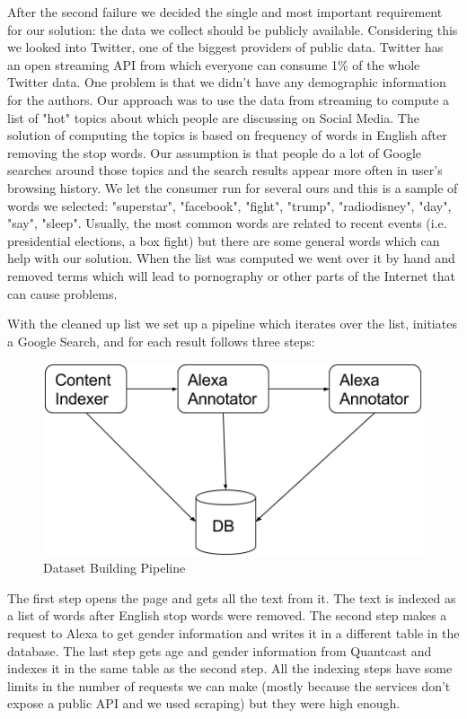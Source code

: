 After the second failure we decided the single and most important requirement for our solution: the data we collect should be publicly available. Considering this we looked into Twitter, one of the biggest providers of public data. Twitter has an open streaming API from which everyone can consume 1\% of the whole Twitter data. One problem is that we didn't have any demographic information for the authors. Our approach was to use the data from streaming to compute a list of "hot" topics about which people are discussing on Social Media. The solution of computing the topics is based on frequency of words in English after removing the stop words. Our assumption is that people do a lot of Google searches around those topics and the search results appear more often in user's browsing history.  We let the consumer run for several ours and this is a sample of words we selected: "superstar", "facebook", "fight", "trump", "radiodisney", "day", "say", "sleep". Usually, the most common words are related to recent events (i.e. presidential elections, a box fight) but there are some general words which can help with our solution. When the list was computed we went over it by hand and removed terms which will lead to pornography or other parts of the Internet that can cause problems.

With the cleaned up list we set up a pipeline which iterates over the list, initiates a Google Search, and for each result follows three steps:
\begin{figure}[h]
\includegraphics[scale=0.4]{DataSetPipeline.png}
\centering
\caption{Dataset Building Pipeline}
\end{figure}

The first step opens the page and gets all the text from it. The text is indexed as a list of words after English stop words were removed. The second step makes a request to Alexa to get gender information and writes it in a different table in the database. The last step gets age and gender information from Quantcast and indexes it in the same table as the second step. All the indexing steps have some limits in the number of requests we can make (mostly because the services don't expose a public API and we used scraping) but they were high enough.

